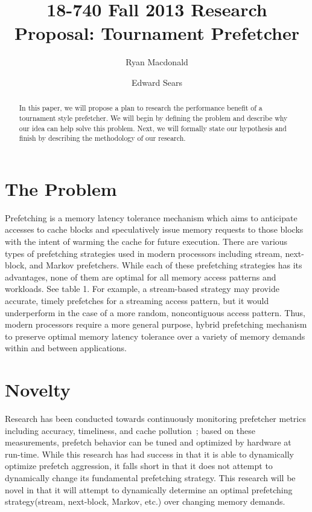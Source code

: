 \documentclass[pageno]{jpaper}
\begin{document}
\title{
18-740 Fall 2013 Research Proposal: Tournament Prefetcher}
\author{Ryan Macdonald \and Edward Sears}

\date{}
\maketitle

\thispagestyle{empty}

\begin{abstract}
In this paper, we will propose a plan to research the performance benefit of 
a tournament style prefetcher. We will begin by defining the problem
and describe why our idea can help solve this problem.  Next, we will formally
state our hypothesis and finish by describing the methodology of our research.
\end{abstract}

\section{The Problem}

Prefetching is a memory latency tolerance mechanism which aims to anticipate 
accesses to cache blocks and speculatively issue memory requests to those blocks with 
the intent of warming the cache for future execution. There are various types of prefetching 
strategies used in modern processors including stream, next-block, and Markov prefetchers. 
While each of these prefetching strategies has its advantages, none of them are optimal 
for all memory access patterns and workloads. See table 1. For example, a stream-based strategy may 
provide accurate, timely prefetches for a streaming access pattern, but it would underperform 
in the case of a more random, noncontiguous access pattern. Thus, modern processors require 
a more general purpose, hybrid prefetching mechanism to preserve optimal memory latency 
tolerance over a variety of memory demands within and between applications.


\section{Novelty}

Research has been conducted towards continuously monitoring prefetcher metrics including 
accuracy, timeliness, and cache pollution~\cite{srinath07}; based on these measurements, prefetch behavior 
can be tuned and optimized by hardware at run-time. While this research has had success 
in that it is able to dynamically optimize prefetch aggression, it falls short in that 
it does not attempt to dynamically change its fundamental prefetching strategy. This research 
will be novel in that it will attempt to dynamically determine an optimal prefetching 
strategy(stream, next-block, Markov, etc.) over changing memory demands. 
\end{document}
